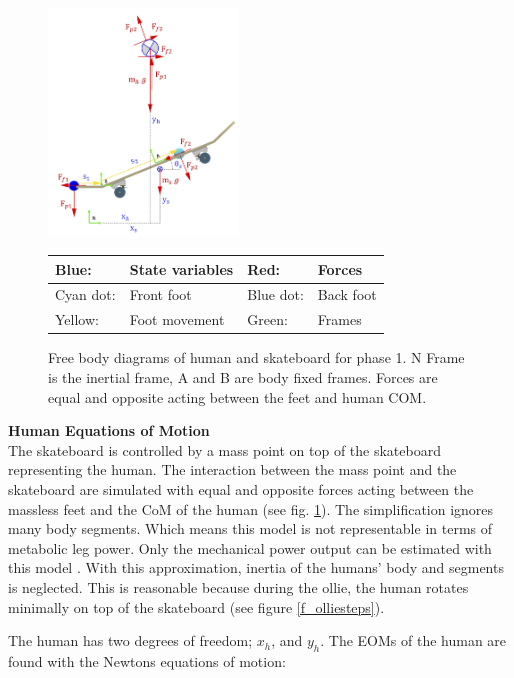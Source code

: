 \documentclass[default,iicol]{sn-jnl}
\theoremstyle{thmstyleone}%
\theoremstyle{thmstyletwo}%
\theoremstyle{thmstylethree}%
\begin{document}
\begin{figure}
    \centering
    \includegraphics[width=0.45\textwidth]{figure/FBD_skater_feet.png}
    \footnotesize\begin{tabular}{|l l|l l|} \hline
    \color{blue}Blue: & State variables &\color{red} Red: & Forces \\ \hline
    \color{cyan}Cyan dot: & Front foot & \color{blue}Blue dot: & Back foot \\ \hline
    \color{yellow}Yellow: & Foot movement & \color{green}Green: & Frames \\ \hline
    \end{tabular}
    \caption[Free Body Diagrams phase 2 and 3]{Free body diagrams of human and skateboard for phase 1. N Frame is the inertial frame, A and B are body fixed frames. Forces are equal and opposite acting between the feet and human COM.}
    \label{f_FBD}
\end{figure}

\textbf{Human Equations of Motion} \\
\noindent The skateboard is controlled by a mass point on top of the skateboard representing the human. The interaction between the mass point and the skateboard are simulated with equal and opposite forces acting between the massless feet and the CoM of the human (see fig. \ref{f_FBD}). The simplification ignores many body segments. Which means this model is not representable in terms of metabolic leg power. Only the mechanical power output can be estimated with this model \cite{van_der_kruk_power_2018,morin_biomechanics_2018}. With this approximation, inertia of the humans' body and segments is neglected. This is reasonable because during the ollie, the human rotates minimally on top of the skateboard (see figure \ref{f_olliesteps}). 

The human has two degrees of freedom; $x_h$, and $y_h$. The EOMs of the human are found with the Newtons equations of motion:
\end{document}
